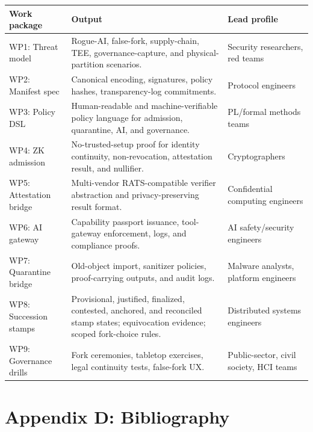 \documentclass[11pt,letterpaper]{article}
\begin{document}
\begin{longtable}{p{}p{}p{}}
\toprule
\textbf{Work package} & \textbf{Output} & \textbf{Lead profile} \\
\midrule
WP1: Threat model & Rogue-AI, false-fork, supply-chain, TEE, governance-capture, and physical-partition scenarios. & Security researchers, red teams \\
\addlinespace
WP2: Manifest spec & Canonical encoding, signatures, policy hashes, transparency-log commitments. & Protocol engineers \\
\addlinespace
WP3: Policy DSL & Human-readable and machine-verifiable policy language for admission, quarantine, AI, and governance. & PL/formal methods teams \\
\addlinespace
WP4: ZK admission & No-trusted-setup proof for identity continuity, non-revocation, attestation result, and nullifier. & Cryptographers \\
\addlinespace
WP5: Attestation bridge & Multi-vendor RATS-compatible verifier abstraction and privacy-preserving result format. & Confidential computing engineers \\
\addlinespace
WP6: AI gateway & Capability passport issuance, tool-gateway enforcement, logs, and compliance proofs. & AI safety/security engineers \\
\addlinespace
WP7: Quarantine bridge & Old-object import, sanitizer policies, proof-carrying outputs, and audit logs. & Malware analysts, platform engineers \\
\addlinespace
WP8: Succession stamps & Provisional, justified, finalized, contested, anchored, and reconciled stamp states; equivocation evidence; scoped fork-choice rules. & Distributed systems engineers \\
\addlinespace
WP9: Governance drills & Fork ceremonies, tabletop exercises, legal continuity tests, false-fork UX. & Public-sector, civil society, HCI teams \\
\bottomrule
\end{longtable}

\section{Appendix D: Bibliography}
\end{document}
